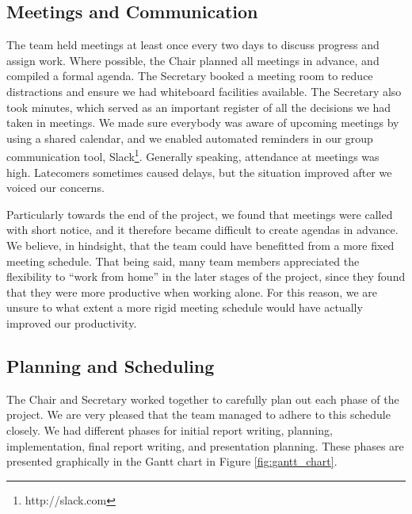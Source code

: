 \subsection{Meetings and Communication}
\label{sec:meetings}
The team held meetings at least once every two days to discuss progress and assign work. Where possible, the Chair planned all meetings in advance, and compiled a formal agenda. The Secretary booked a meeting room to reduce distractions and ensure we had whiteboard facilities available. The Secretary also took minutes, which served as an important register of all the decisions we had taken in meetings. We made sure everybody was aware of upcoming meetings by using a shared calendar, and we enabled automated reminders in our group communication tool, Slack\footnote{http://slack.com}. Generally speaking, attendance at meetings was high. Latecomers sometimes caused delays, but the situation improved after we voiced our concerns. 

Particularly towards the end of the project, we found that meetings were called with short notice, and it therefore became difficult to create agendas in advance. We believe, in hindsight, that the team could have benefitted from a more fixed meeting schedule. That being said, many team members appreciated the flexibility to “work from home” in the later stages of the project, since they found that they were more productive when working alone. For this reason, we are unsure to what extent a more rigid meeting schedule would have actually improved our productivity.

\subsection{Planning and Scheduling}
The Chair and Secretary worked together to carefully plan out each phase of the project. We are very pleased that the team managed to adhere to this schedule closely. We had different phases for initial report writing, planning, implementation, final report writing, and presentation planning. These phases are presented graphically in the Gantt chart in Figure \ref{fig:gantt_chart}.

